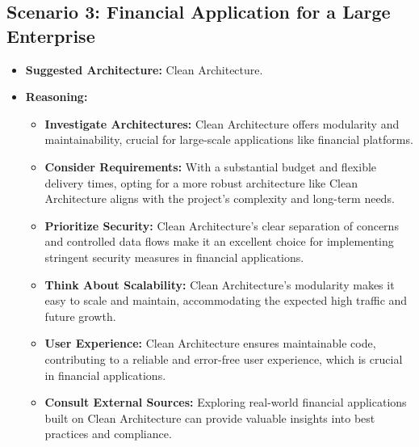 \subsection*{Scenario 3: Financial Application for a Large Enterprise}
\begin{itemize}
	\item \textbf{Suggested Architecture:} Clean Architecture.
	\item \textbf{Reasoning:}
	\begin{itemize}
		\item \textbf{Investigate Architectures:} Clean Architecture offers modularity and maintainability, crucial for large-scale applications like financial platforms.
		\item \textbf{Consider Requirements:} With a substantial budget and flexible delivery times, opting for a more robust architecture like Clean Architecture aligns with the project's complexity and long-term needs.
		\item \textbf{Prioritize Security:} Clean Architecture's clear separation of concerns and controlled data flows make it an excellent choice for implementing stringent security measures in financial applications.
		\item \textbf{Think About Scalability:} Clean Architecture's modularity makes it easy to scale and maintain, accommodating the expected high traffic and future growth.
		\item \textbf{User Experience:} Clean Architecture ensures maintainable code, contributing to a reliable and error-free user experience, which is crucial in financial applications.
		\item \textbf{Consult External Sources:} Exploring real-world financial applications built on Clean Architecture can provide valuable insights into best practices and compliance.
	\end{itemize}
\end{itemize}

